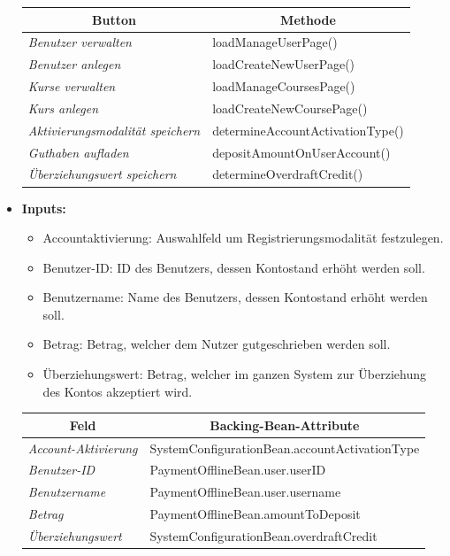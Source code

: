 \begin{itemize}
\begin{center}
\begin{longtable}{|p{4cm} |p{7cm} |}
					\hline \multicolumn{1}{|c|}{\textbf{Button}} & \multicolumn{1}{|c|}{\textbf{Methode}} \\ \hline
					\endfirsthead
					\hline
					\endlastfoot
			
					\textit{Benutzer verwalten} & loadManageUserPage()\\ \hline
					\textit{Benutzer anlegen} &  loadCreateNewUserPage()\\ \hline
					\textit{Kurse verwalten} & loadManageCoursesPage()\\ \hline
					\textit{Kurs anlegen} & loadCreateNewCoursePage()\\ \hline
					\textit{Aktivierungsmodalität speichern} & determineAccountActivationType()\\ \hline
					\textit{Guthaben aufladen} & depositAmountOnUserAccount()\\ \hline
					\textit{Überziehungswert speichern} & determineOverdraftCredit()\\ \hline
				\end{longtable}
			\end{center}
			\item \textbf{Inputs:}
			\begin{itemize}
				\item Accountaktivierung: Auswahlfeld um Registrierungsmodalität festzulegen.
				\item Benutzer-ID: ID des Benutzers, dessen Kontostand erhöht werden soll.
				\item Benutzername: Name des Benutzers, dessen Kontostand erhöht werden soll.
				\item Betrag: Betrag, welcher dem Nutzer gutgeschrieben werden soll.
				\item Überziehungswert: Betrag, welcher im ganzen System zur Überziehung des Kontos akzeptiert wird.
			\end{itemize}

				\begin{center}
					\begin{longtable}{|p{3cm} |p{}|}
						
						\hline \multicolumn{1}{|c|}{\textbf{Feld}} & \multicolumn{1}{|c|}{\textbf{Backing-Bean-Attribute}}\\ \hline
						\endfirsthead
						\hline
						\endlastfoot
						\textit{Account-Aktivierung} & SystemConfigurationBean.accountActivationType\\ \hline
						\textit{Benutzer-ID} & PaymentOfflineBean.user.userID\\ \hline
						\textit{Benutzername} & PaymentOfflineBean.user.username\\ \hline
						\textit{Betrag} & PaymentOfflineBean.amountToDeposit\\ \hline
						\textit{Überziehungswert} & SystemConfigurationBean.overdraftCredit\\ \hline
					\end{longtable}
					\begin{longtable}{|p{3cm}| p{4cm}|p{3cm} |p{3cm}|}
						

\end{longtable}
\end{center}
\end{itemize}
